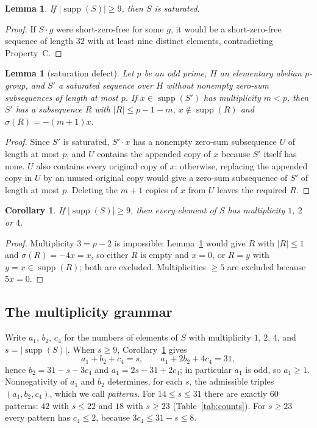 \documentclass[11pt]{article}
\newtheorem{lemma}[theorem]{Lemma}
\newtheorem{corollary}[theorem]{Corollary}
\theoremstyle{definition}
\theoremstyle{remark}
\newcommand{\supp}{\operatorname{supp}}
\begin{document}
\begin{lemma}\label{lem:saturated}
If $|\supp(S)|\ge9$, then $S$ is saturated.
\end{lemma}

\begin{proof}
If $S\cdot g$ were short-zero-free for some $g$, it would be a short-zero-free sequence of length $32$ with at least nine distinct elements, contradicting Property~C.
\end{proof}

\begin{lemma}[saturation defect]\label{lem:defect}
Let $p$ be an odd prime, $H$ an elementary abelian $p$-group, and $S'$ a saturated sequence over $H$ without nonempty zero-sum subsequences of length at most $p$. If $x\in\supp(S')$ has multiplicity $m<p$, then $S'$ has a subsequence $R$ with $|R|\le p-1-m$, $x\notin\supp(R)$ and $\sigma(R)=-(m+1)x$.
\end{lemma}

\begin{proof}
Since $S'$ is saturated, $S'\cdot x$ has a nonempty zero-sum subsequence $U$ of length at most $p$, and $U$ contains the appended copy of $x$ because $S'$ itself has none. $U$ also contains every original copy of $x$: otherwise, replacing the appended copy in $U$ by an unused original copy would give a zero-sum subsequence of $S'$ of length at most $p$. Deleting the $m+1$ copies of $x$ from $U$ leaves the required $R$.
\end{proof}

\begin{corollary}\label{cor:mult}
If $|\supp(S)|\ge9$, then every element of $S$ has multiplicity $1$, $2$ or $4$.
\end{corollary}

\begin{proof}
Multiplicity $3=p-2$ is impossible: Lemma~\ref{lem:defect} would give $R$ with $|R|\le1$ and $\sigma(R)=-4x=x$, so either $R$ is empty and $x=0$, or $R=y$ with $y=x\in\supp(R)$; both are excluded. Multiplicities $\ge5$ are excluded because $5x=0$.
\end{proof}

\subsection{The multiplicity grammar}

Write $a_1$, $b_2$, $c_4$ for the numbers of elements of $S$ with multiplicity $1$, $2$, $4$, and $s=|\supp(S)|$. When $s\ge9$, Corollary~\ref{cor:mult} gives
\begin{equation}\label{eq:grammar}
a_1+b_2+c_4=s,\qquad a_1+2b_2+4c_4=31,
\end{equation}
hence $b_2=31-s-3c_4$ and $a_1=2s-31+2c_4$; in particular $a_1$ is odd, so $a_1\ge1$. Nonnegativity of $a_1$ and $b_2$ determines, for each $s$, the admissible triples $(a_1,b_2,c_4)$, which we call \emph{patterns}. For $14\le s\le31$ there are exactly $60$ patterns: $42$ with $s\le22$ and $18$ with $s\ge23$ (Table~\ref{tab:counts}). For $s\ge23$ every pattern has $c_4\le2$, because $3c_4\le31-s\le8$.
\end{document}

